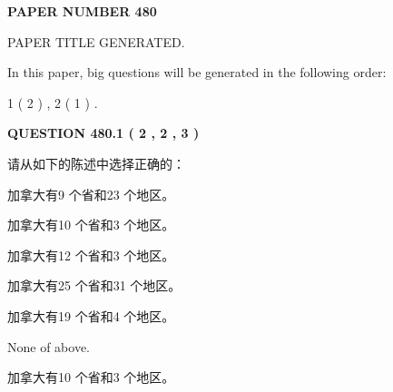 \documentclass{ctexart}
\begin{document}
   
   
   
\newpage 
\setcounter{page}{ 
   480001 } 
   
   
   
   
 {\textbf{ \Large{ PAPER NUMBER  480  }}}
   
   
\vspace{0.2in}
   
   
   
   
   
   
   
   
 \vspace{0.2in}
 
 
 
 
   
   
 PAPER TITLE GENERATED.
   
   
   
\vspace{0.2in}
   
In this paper, big questions will be generated in the following order: 
   
   
   1 ( 2 )
 ,
   2 ( 1 )
 .
  
\vspace{0.2in}
  
{\textbf{\Large{QUESTION
480.1 
 ( 2 , 2 , 3 )
}}}
  
  
请从如下的陈述中选择正确的：
 
 
加拿大有9 个省和23 个地区。
 
 
加拿大有10 个省和3 个地区。
 
 
加拿大有12 个省和3 个地区。
 
 
加拿大有25 个省和31 个地区。
 
 
加拿大有19 个省和4 个地区。
 
 
 None of above.
 
 
\noindent{}
 
 
加拿大有10 个省和3 个地区。
 
 
\noindent{}
 
 
   
   
   
\end{document}
